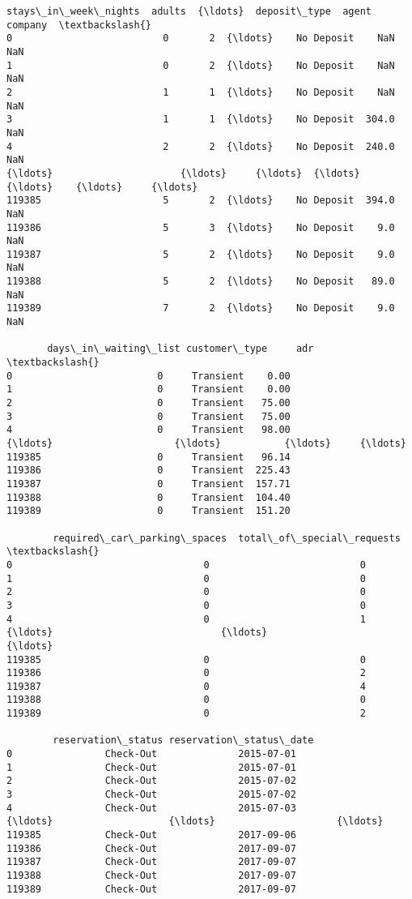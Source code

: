 \documentclass[11pt]{article}
\begin{document}
\begin{tcolorbox}[breakable, size=fbox, boxrule=.5pt, pad at break*=1mm, opacityfill=0]
\begin{Verbatim}[commandchars=\\\{\}]
        stays\_in\_week\_nights  adults  {\ldots}  deposit\_type  agent company  \textbackslash{}
0                          0       2  {\ldots}    No Deposit    NaN     NaN
1                          0       2  {\ldots}    No Deposit    NaN     NaN
2                          1       1  {\ldots}    No Deposit    NaN     NaN
3                          1       1  {\ldots}    No Deposit  304.0     NaN
4                          2       2  {\ldots}    No Deposit  240.0     NaN
{\ldots}                      {\ldots}     {\ldots}  {\ldots}           {\ldots}    {\ldots}     {\ldots}
119385                     5       2  {\ldots}    No Deposit  394.0     NaN
119386                     5       3  {\ldots}    No Deposit    9.0     NaN
119387                     5       2  {\ldots}    No Deposit    9.0     NaN
119388                     5       2  {\ldots}    No Deposit   89.0     NaN
119389                     7       2  {\ldots}    No Deposit    9.0     NaN

       days\_in\_waiting\_list customer\_type     adr  \textbackslash{}
0                         0     Transient    0.00
1                         0     Transient    0.00
2                         0     Transient   75.00
3                         0     Transient   75.00
4                         0     Transient   98.00
{\ldots}                     {\ldots}           {\ldots}     {\ldots}
119385                    0     Transient   96.14
119386                    0     Transient  225.43
119387                    0     Transient  157.71
119388                    0     Transient  104.40
119389                    0     Transient  151.20

        required\_car\_parking\_spaces  total\_of\_special\_requests  \textbackslash{}
0                                 0                          0
1                                 0                          0
2                                 0                          0
3                                 0                          0
4                                 0                          1
{\ldots}                             {\ldots}                        {\ldots}
119385                            0                          0
119386                            0                          2
119387                            0                          4
119388                            0                          0
119389                            0                          2

        reservation\_status reservation\_status\_date
0                Check-Out              2015-07-01
1                Check-Out              2015-07-01
2                Check-Out              2015-07-02
3                Check-Out              2015-07-02
4                Check-Out              2015-07-03
{\ldots}                    {\ldots}                     {\ldots}
119385           Check-Out              2017-09-06
119386           Check-Out              2017-09-07
119387           Check-Out              2017-09-07
119388           Check-Out              2017-09-07
119389           Check-Out              2017-09-07


\end{Verbatim}
\end{tcolorbox}
\end{document}
